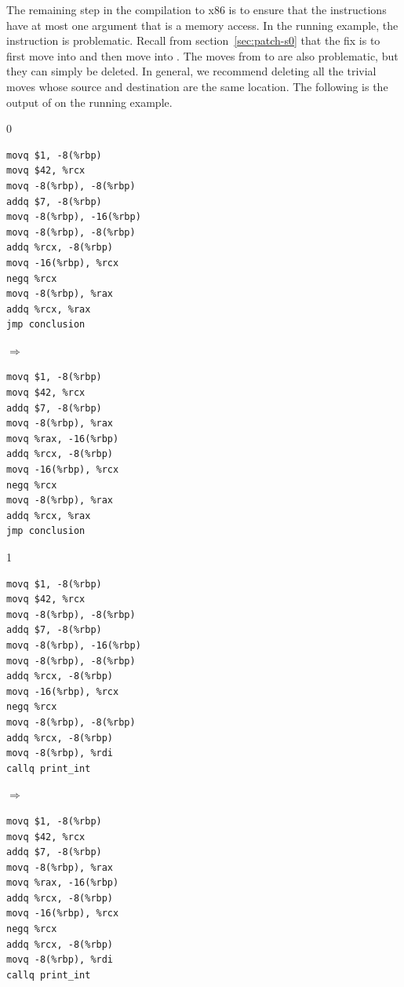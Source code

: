 \documentclass[7x10]{TimesAPriori_MIT}%
\def\racketEd{0}
\def\pythonEd{1}
\providecommand{\BookEdition}{1}
\let\edition\BookEdition
\newcommand{\pythonColor}[0]{}
\numberwithin{theorem}{chapter}
\numberwithin{definition}{chapter}
\numberwithin{equation}{chapter}
\begin{document}
The remaining step in the compilation to x86 is to ensure that the
instructions have at most one argument that is a memory access.
%
In the running example, the instruction  is problematic. Recall from section~\ref{sec:patch-s0}
  that the fix is to first move  into  and
  then move  into .
%
The moves from  to  are also
problematic, but they can simply be deleted. In general, we recommend
deleting all the trivial moves whose source and destination are the
same location.
%
The following is the output of  on the
running example.
\begin{center}
{\if\edition\racketEd      
\begin{minipage}{0.35\textwidth}
\begin{lstlisting}
movq $1, -8(%rbp)
movq $42, %rcx
movq -8(%rbp), -8(%rbp)
addq $7, -8(%rbp)
movq -8(%rbp), -16(%rbp)
movq -8(%rbp), -8(%rbp)
addq %rcx, -8(%rbp)
movq -16(%rbp), %rcx
negq %rcx
movq -8(%rbp), %rax
addq %rcx, %rax
jmp conclusion
\end{lstlisting}
\end{minipage}
$\Rightarrow\qquad$
\begin{minipage}{0.45\textwidth}
\begin{lstlisting}
movq $1, -8(%rbp)
movq $42, %rcx
addq $7, -8(%rbp)
movq -8(%rbp), %rax
movq %rax, -16(%rbp)
addq %rcx, -8(%rbp)
movq -16(%rbp), %rcx
negq %rcx
movq -8(%rbp), %rax
addq %rcx, %rax
jmp conclusion
\end{lstlisting}
\end{minipage}
\fi}
{\if\edition\pythonEd\pythonColor
\begin{minipage}{0.35\textwidth}
\begin{lstlisting}
movq $1, -8(%rbp)
movq $42, %rcx
movq -8(%rbp), -8(%rbp)
addq $7, -8(%rbp)
movq -8(%rbp), -16(%rbp)
movq -8(%rbp), -8(%rbp)
addq %rcx, -8(%rbp)
movq -16(%rbp), %rcx
negq %rcx
movq -8(%rbp), -8(%rbp)
addq %rcx, -8(%rbp)
movq -8(%rbp), %rdi
callq print_int    
\end{lstlisting}
\end{minipage}
$\Rightarrow\qquad$
\begin{minipage}{0.45\textwidth}
\begin{lstlisting}
movq $1, -8(%rbp)
movq $42, %rcx
addq $7, -8(%rbp)
movq -8(%rbp), %rax
movq %rax, -16(%rbp)
addq %rcx, -8(%rbp)
movq -16(%rbp), %rcx
negq %rcx
addq %rcx, -8(%rbp)
movq -8(%rbp), %rdi
callq print_int    
\end{lstlisting}
\end{minipage}
\fi}
\end{center}
\end{document}
